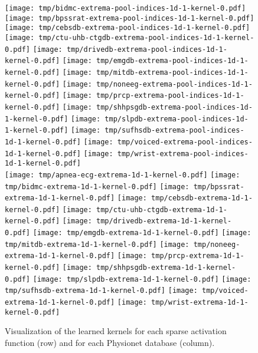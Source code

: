 \documentclass[journal]{IEEEtran}
\begin{document}
\begin{figure*}[!t]
	\texttt{[image: tmp/bidmc-extrema-pool-indices-1d-1-kernel-0.pdf]}
	\texttt{[image: tmp/bpssrat-extrema-pool-indices-1d-1-kernel-0.pdf]}
	\texttt{[image: tmp/cebsdb-extrema-pool-indices-1d-1-kernel-0.pdf]}
	\texttt{[image: tmp/ctu-uhb-ctgdb-extrema-pool-indices-1d-1-kernel-0.pdf]}
	\texttt{[image: tmp/drivedb-extrema-pool-indices-1d-1-kernel-0.pdf]}
	\texttt{[image: tmp/emgdb-extrema-pool-indices-1d-1-kernel-0.pdf]}
	\texttt{[image: tmp/mitdb-extrema-pool-indices-1d-1-kernel-0.pdf]}
	\texttt{[image: tmp/noneeg-extrema-pool-indices-1d-1-kernel-0.pdf]}
	\texttt{[image: tmp/prcp-extrema-pool-indices-1d-1-kernel-0.pdf]}
	\texttt{[image: tmp/shhpsgdb-extrema-pool-indices-1d-1-kernel-0.pdf]}
	\texttt{[image: tmp/slpdb-extrema-pool-indices-1d-1-kernel-0.pdf]}
	\texttt{[image: tmp/sufhsdb-extrema-pool-indices-1d-1-kernel-0.pdf]}
	\texttt{[image: tmp/voiced-extrema-pool-indices-1d-1-kernel-0.pdf]}
	\texttt{[image: tmp/wrist-extrema-pool-indices-1d-1-kernel-0.pdf]}
	\\
	\texttt{[image: tmp/apnea-ecg-extrema-1d-1-kernel-0.pdf]}
	\texttt{[image: tmp/bidmc-extrema-1d-1-kernel-0.pdf]}
	\texttt{[image: tmp/bpssrat-extrema-1d-1-kernel-0.pdf]}
	\texttt{[image: tmp/cebsdb-extrema-1d-1-kernel-0.pdf]}
	\texttt{[image: tmp/ctu-uhb-ctgdb-extrema-1d-1-kernel-0.pdf]}
	\texttt{[image: tmp/drivedb-extrema-1d-1-kernel-0.pdf]}
	\texttt{[image: tmp/emgdb-extrema-1d-1-kernel-0.pdf]}
	\texttt{[image: tmp/mitdb-extrema-1d-1-kernel-0.pdf]}
	\texttt{[image: tmp/noneeg-extrema-1d-1-kernel-0.pdf]}
	\texttt{[image: tmp/prcp-extrema-1d-1-kernel-0.pdf]}
	\texttt{[image: tmp/shhpsgdb-extrema-1d-1-kernel-0.pdf]}
	\texttt{[image: tmp/slpdb-extrema-1d-1-kernel-0.pdf]}
	\texttt{[image: tmp/sufhsdb-extrema-1d-1-kernel-0.pdf]}
	\texttt{[image: tmp/voiced-extrema-1d-1-kernel-0.pdf]}
	\texttt{[image: tmp/wrist-extrema-1d-1-kernel-0.pdf]}
	\caption{Visualization of the learned kernels for each sparse activation function (row) and for each Physionet database (column).
	}\label{fig:kernelvisualization}
\end{figure*}
\end{document}
